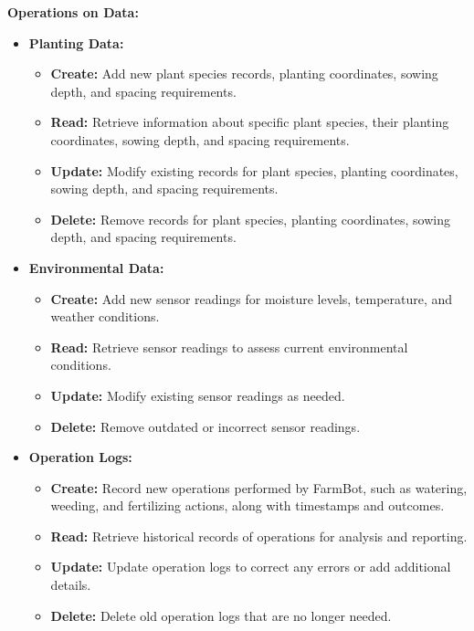 \textbf{Operations on Data:}

\begin{itemize}
    \item \textbf{Planting Data:}
    \begin{itemize}
        \item \textbf{Create:} Add new plant species records, planting coordinates, sowing depth, and spacing requirements.
        \item \textbf{Read:} Retrieve information about specific plant species, their planting coordinates, sowing depth, and spacing requirements.
        \item \textbf{Update:} Modify existing records for plant species, planting coordinates, sowing depth, and spacing requirements.
        \item \textbf{Delete:} Remove records for plant species, planting coordinates, sowing depth, and spacing requirements.
    \end{itemize}
    
    \item \textbf{Environmental Data:}
    \begin{itemize}
        \item \textbf{Create:} Add new sensor readings for moisture levels, temperature, and weather conditions.
        \item \textbf{Read:} Retrieve sensor readings to assess current environmental conditions.
        \item \textbf{Update:} Modify existing sensor readings as needed.
        \item \textbf{Delete:} Remove outdated or incorrect sensor readings.
    \end{itemize}
    
    \item \textbf{Operation Logs:}
    \begin{itemize}
        \item \textbf{Create:} Record new operations performed by FarmBot, such as watering, weeding, and fertilizing actions, along with timestamps and outcomes.
        \item \textbf{Read:} Retrieve historical records of operations for analysis and reporting.
        \item \textbf{Update:} Update operation logs to correct any errors or add additional details.
        \item \textbf{Delete:} Delete old operation logs that are no longer needed.
    \end{itemize}
    

\end{itemize}
